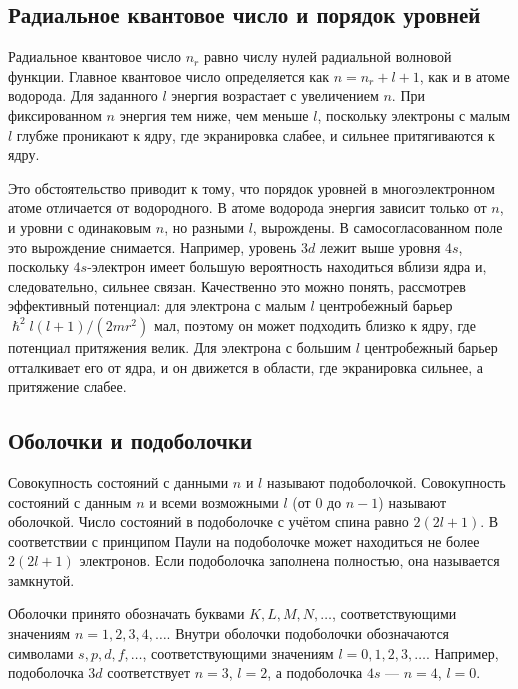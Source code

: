 \documentclass[a4paper, 12pt]{article}
\numberwithin{equation}{section}
\begin{document}
\subsection{Радиальное квантовое число и порядок уровней}
\label{subsec:radial_quantum_number}

Радиальное квантовое число $n_r$ равно числу нулей радиальной волновой функции. Главное квантовое число определяется как $n = n_r + l + 1$, как и в атоме водорода. Для заданного $l$ энергия возрастает с увеличением $n$. При фиксированном $n$ энергия тем ниже, чем меньше $l$, поскольку электроны с малым $l$ глубже проникают к ядру, где экранировка слабее, и сильнее притягиваются к ядру.

Это обстоятельство приводит к тому, что порядок уровней в многоэлектронном атоме отличается от водородного. В атоме водорода энергия зависит только от $n$, и уровни с одинаковым $n$, но разными $l$, вырождены. В самосогласованном поле это вырождение снимается. Например, уровень $3d$ лежит выше уровня $4s$, поскольку $4s$-электрон имеет большую вероятность находиться вблизи ядра и, следовательно, сильнее связан. Качественно это можно понять, рассмотрев эффективный потенциал: для электрона с малым $l$ центробежный барьер $\hslash^2 l(l+1)/(2mr^2)$ мал, поэтому он может подходить близко к ядру, где потенциал притяжения велик. Для электрона с большим $l$ центробежный барьер отталкивает его от ядра, и он движется в области, где экранировка сильнее, а притяжение слабее.

\subsection{Оболочки и подоболочки}
\label{subsec:shells_subs}

Совокупность состояний с данными $n$ и $l$ называют подоболочкой. Совокупность состояний с данным $n$ и всеми возможными $l$ (от $0$ до $n-1$) называют оболочкой. Число состояний в подоболочке с учётом спина равно $2(2l+1)$. В соответствии с принципом Паули на подоболочке может находиться не более $2(2l+1)$ электронов. Если подоболочка заполнена полностью, она называется замкнутой.

Оболочки принято обозначать буквами $K, L, M, N, \dots$, соответствующими значениям $n = 1, 2, 3, 4, \dots$. Внутри оболочки подоболочки обозначаются символами $s, p, d, f, \dots$, соответствующими значениям $l = 0, 1, 2, 3, \dots$. Например, подоболочка $3d$ соответствует $n = 3$, $l = 2$, а подоболочка $4s$ --- $n = 4$, $l = 0$.
\end{document}
